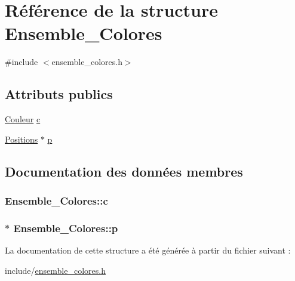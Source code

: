 \hypertarget{structEnsemble__Colores}{\section{\-Référence de la structure \-Ensemble\-\_\-\-Colores}
\label{structEnsemble__Colores}
}


{\ttfamily \#include $<$ensemble\-\_\-colores.\-h$>$}

\subsection*{\-Attributs publics}
\begin{DoxyCompactItemize}
\item 
\hyperlink{couleur_8h_ae253e1bdbff71a044d939ee96ba0814a}{\-Couleur} \hyperlink{structEnsemble__Colores_ac6e238df5b4b896d72d3a54bceb3502b}{c}
\item 
\hyperlink{positions_8h_abfec3f4df359d071393d062f4aa9bf82}{\-Positions} $\ast$ \hyperlink{structEnsemble__Colores_ade944f566879fa1e8e29bd4eaad1cbe4}{p}
\end{DoxyCompactItemize}


\subsection{\-Documentation des données membres}
\hypertarget{structEnsemble__Colores_ac6e238df5b4b896d72d3a54bceb3502b}{
\subsubsection[{c}]{ {\bf \-Ensemble\-\_\-\-Colores\-::c}}}\label{structEnsemble__Colores_ac6e238df5b4b896d72d3a54bceb3502b}
\hypertarget{structEnsemble__Colores_ade944f566879fa1e8e29bd4eaad1cbe4}{
\subsubsection[{p}]{$\ast$ {\bf \-Ensemble\-\_\-\-Colores\-::p}}}\label{structEnsemble__Colores_ade944f566879fa1e8e29bd4eaad1cbe4}


\-La documentation de cette structure a été générée à partir du fichier suivant \-:\begin{DoxyCompactItemize}
\item 
include/\hyperlink{ensemble__colores_8h}{ensemble\-\_\-colores.\-h}\end{DoxyCompactItemize}
